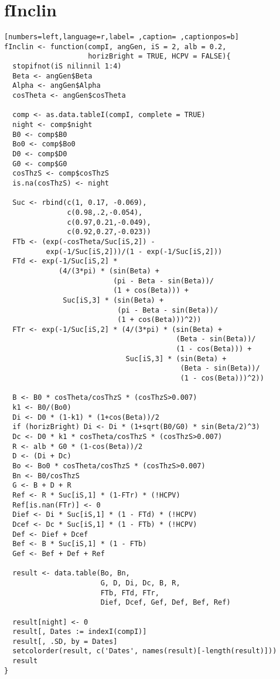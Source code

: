 \section{fInclin}
\label{sec:orgb0bb9e9}
\begin{lstlisting}[numbers=left,language=r,label= ,caption= ,captionpos=b]
fInclin <- function(compI, angGen, iS = 2, alb = 0.2,
                    horizBright = TRUE, HCPV = FALSE){
  stopifnot(iS nilinnil 1:4)
  Beta <- angGen$Beta
  Alpha <- angGen$Alpha
  cosTheta <- angGen$cosTheta

  comp <- as.data.tableI(compI, complete = TRUE)
  night <- comp$night
  B0 <- comp$B0
  Bo0 <- comp$Bo0
  D0 <- comp$D0
  G0 <- comp$G0
  cosThzS <- comp$cosThzS
  is.na(cosThzS) <- night

  Suc <- rbind(c(1, 0.17, -0.069),
               c(0.98,.2,-0.054),
               c(0.97,0.21,-0.049),
               c(0.92,0.27,-0.023))
  FTb <- (exp(-cosTheta/Suc[iS,2]) -
          exp(-1/Suc[iS,2]))/(1 - exp(-1/Suc[iS,2]))
  FTd <- exp(-1/Suc[iS,2] *
             (4/(3*pi) * (sin(Beta) +
                          (pi - Beta - sin(Beta))/
                          (1 + cos(Beta))) +
              Suc[iS,3] * (sin(Beta) +
                           (pi - Beta - sin(Beta))/
                           (1 + cos(Beta)))^2))
  FTr <- exp(-1/Suc[iS,2] * (4/(3*pi) * (sin(Beta) +
                                         (Beta - sin(Beta))/
                                         (1 - cos(Beta))) +
                             Suc[iS,3] * (sin(Beta) +
                                          (Beta - sin(Beta))/
                                          (1 - cos(Beta)))^2))

  B <- B0 * cosTheta/cosThzS * (cosThzS>0.007) 
  k1 <- B0/(Bo0)
  Di <- D0 * (1-k1) * (1+cos(Beta))/2
  if (horizBright) Di <- Di * (1+sqrt(B0/G0) * sin(Beta/2)^3)
  Dc <- D0 * k1 * cosTheta/cosThzS * (cosThzS>0.007)
  R <- alb * G0 * (1-cos(Beta))/2
  D <- (Di + Dc)
  Bo <- Bo0 * cosTheta/cosThzS * (cosThzS>0.007) 
  Bn <- B0/cosThzS
  G <- B + D + R
  Ref <- R * Suc[iS,1] * (1-FTr) * (!HCPV)
  Ref[is.nan(FTr)] <- 0 
  Dief <- Di * Suc[iS,1] * (1 - FTd) * (!HCPV)
  Dcef <- Dc * Suc[iS,1] * (1 - FTb) * (!HCPV)
  Def <- Dief + Dcef
  Bef <- B * Suc[iS,1] * (1 - FTb)
  Gef <- Bef + Def + Ref

  result <- data.table(Bo, Bn,
                       G, D, Di, Dc, B, R,
                       FTb, FTd, FTr,
                       Dief, Dcef, Gef, Def, Bef, Ref) 

  result[night] <- 0
  result[, Dates := indexI(compI)]
  result[, .SD, by = Dates]
  setcolorder(result, c('Dates', names(result)[-length(result)]))
  result
}
\end{lstlisting}
